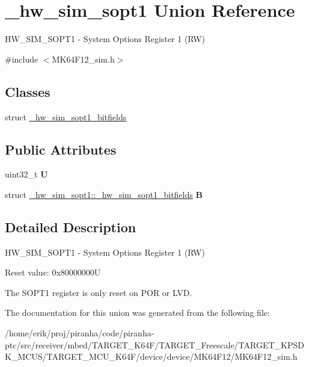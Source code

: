 \hypertarget{union__hw__sim__sopt1}{}\section{\+\_\+hw\+\_\+sim\+\_\+sopt1 Union Reference}
\label{union__hw__sim__sopt1}


H\+W\+\_\+\+S\+I\+M\+\_\+\+S\+O\+P\+T1 -\/ System Options Register 1 (RW)  




{\ttfamily \#include $<$M\+K64\+F12\+\_\+sim.\+h$>$}

\subsection*{Classes}
\begin{DoxyCompactItemize}
\item 
struct \hyperlink{struct__hw__sim__sopt1_1_1__hw__sim__sopt1__bitfields}{\+\_\+hw\+\_\+sim\+\_\+sopt1\+\_\+bitfields}
\end{DoxyCompactItemize}
\subsection*{Public Attributes}
\begin{DoxyCompactItemize}
\item 
uint32\+\_\+t {\bfseries U}\hypertarget{union__hw__sim__sopt1_a3b76bc0e04d21fbec247081dea49bb7a}{}\label{union__hw__sim__sopt1_a3b76bc0e04d21fbec247081dea49bb7a}

\item 
struct \hyperlink{struct__hw__sim__sopt1_1_1__hw__sim__sopt1__bitfields}{\+\_\+hw\+\_\+sim\+\_\+sopt1\+::\+\_\+hw\+\_\+sim\+\_\+sopt1\+\_\+bitfields} {\bfseries B}\hypertarget{union__hw__sim__sopt1_ab6f0ba92ff48211d5a2c97294979f63e}{}\label{union__hw__sim__sopt1_ab6f0ba92ff48211d5a2c97294979f63e}

\end{DoxyCompactItemize}


\subsection{Detailed Description}
H\+W\+\_\+\+S\+I\+M\+\_\+\+S\+O\+P\+T1 -\/ System Options Register 1 (RW) 

Reset value\+: 0x80000000U

The S\+O\+P\+T1 register is only reset on P\+OR or L\+VD. 

The documentation for this union was generated from the following file\+:\begin{DoxyCompactItemize}
\item 
/home/erik/proj/piranha/code/piranha-\/ptc/src/receiver/mbed/\+T\+A\+R\+G\+E\+T\+\_\+\+K64\+F/\+T\+A\+R\+G\+E\+T\+\_\+\+Freescale/\+T\+A\+R\+G\+E\+T\+\_\+\+K\+P\+S\+D\+K\+\_\+\+M\+C\+U\+S/\+T\+A\+R\+G\+E\+T\+\_\+\+M\+C\+U\+\_\+\+K64\+F/device/device/\+M\+K64\+F12/M\+K64\+F12\+\_\+sim.\+h\end{DoxyCompactItemize}
